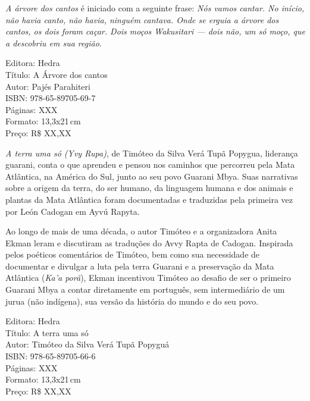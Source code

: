 \pagebreak


\noindent{}\textit{A árvore dos cantos} é iniciado com a seguinte frase: \textit{Nós vamos cantar. No início, não havia canto, não havia, ninguém cantava. Onde se erguia a árvore dos cantos, os dois foram caçar. Dois moços Wakusitari --- dois não, um só moço, que a descobriu em sua região}.

\begin{ficha}
Editora: Hedra\\
Título: A Árvore dos cantos\\
Autor:  Pajés Parahiteri\\ 
ISBN: 978-65-89705-69-7\\
Páginas: XXX\\
Formato: 13,3x21\,cm\\
Preço: R\$ XX,XX\\
\end{ficha}

\pagebreak


\noindent{}\textit{A terra uma só (Yvy Rupa)}, de Timóteo da Silva Verá Tupã Popygua, liderança guarani, conta o que aprendeu e pensou nos caminhos que percorreu pela Mata Atlântica, na América do Sul, junto ao seu povo Guarani Mbya. Suas narrativas sobre a origem da terra, do ser humano, da linguagem humana e dos animais e plantas da Mata Atlântica foram documentadas e traduzidas pela primeira vez por León Cadogan em Ayvú Rapyta. 

Ao longo de mais de uma década, o autor Timóteo e a organizadora Anita Ekman leram e discutiram as traduções do Avvy Rapta de Cadogan. Inspirada pelos poéticos comentários de Timóteo, bem como sua necessidade de documentar e divulgar a luta pela terra Guarani e a preservação da Mata Atlântica (\textit{Ka’a porã}), Ekman incentivou Timóteo ao desafio de ser o primeiro Guarani Mbya a contar diretamente em português, sem intermediário de um jurua (não indígena), sua versão da história do mundo e do seu povo.

\begin{ficha}
Editora: Hedra\\
Título: A terra uma só\\
Autor:  Timóteo da Silva Verá Tupã Popyguá\\ 
ISBN: 978-65-89705-66-6\\
Páginas: XXX\\
Formato: 13,3x21\,cm\\
Preço: R\$ XX,XX\\
\end{ficha}

